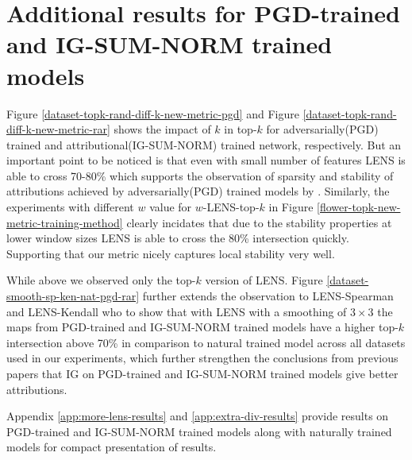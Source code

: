 \documentclass[letterpaper]{article} %
\begin{document}
\clearpage

\section{Additional results for PGD-trained and IG-SUM-NORM trained models} \label{app:pgd-rar-results}

Figure \ref{dataset-topk-rand-diff-k-new-metric-pgd} and Figure \ref{dataset-topk-rand-diff-k-new-metric-rar} shows the impact of $k$ in top-$k$ for adversarially(PGD) trained and attributional(IG-SUM-NORM) trained network, respectively. But an important point to be noticed is that even with small number of features LENS is able to cross 70-80\% which supports the observation of sparsity and stability of attributions achieved by adversarially(PGD) trained models by \citet{ChalasaniC00J20}. Similarly, the experiments with different $w$ value for $w$-LENS-top-$k$ in Figure \ref{flower-topk-new-metric-training-method} clearly incidates that due to the stability properties at lower window sizes LENS is able to cross the 80\% intersection quickly. Supporting that our metric nicely captures local stability very well. 

While above we observed only the top-$k$ version of LENS. Figure \ref{dataset-smooth-sp-ken-nat-pgd-rar} further extends the observation to LENS-Spearman and LENS-Kendall who to show that with LENS with a smoothing of $3 \times 3$ the maps from PGD-trained and IG-SUM-NORM trained models have a higher top-$k$ intersection above 70\% in comparison to natural trained model across all datasets used in our experiments, which further strengthen the conclusions from previous papers that IG on PGD-trained and IG-SUM-NORM trained models give better attributions.

Appendix \ref{app:more-lens-results} and \ref{app:extra-div-results} provide results on PGD-trained and IG-SUM-NORM trained models along with naturally trained models for compact presentation of results.
\end{document}
